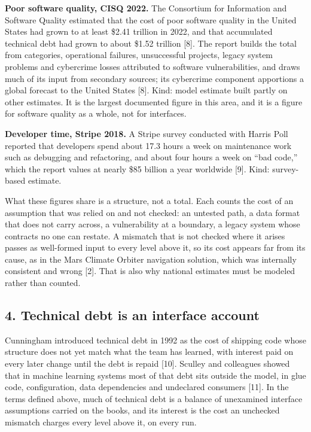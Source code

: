 \documentclass[
  10pt,
]{article}
\begin{document}
\textbf{Poor software quality, CISQ 2022.} The Consortium for
Information and Software Quality estimated that the cost of poor
software quality in the United States had grown to at least \$2.41
trillion in 2022, and that accumulated technical debt had grown to about
\$1.52 trillion {[}8{]}. The report builds the total from categories,
operational failures, unsuccessful projects, legacy system problems and
cybercrime losses attributed to software vulnerabilities, and draws much
of its input from secondary sources; its cybercrime component apportions
a global forecast to the United States {[}8{]}. Kind: model estimate
built partly on other estimates. It is the largest documented figure in
this area, and it is a figure for software quality as a whole, not for
interfaces.

\textbf{Developer time, Stripe 2018.} A Stripe survey conducted with
Harris Poll reported that developers spend about 17.3 hours a week on
maintenance work such as debugging and refactoring, and about four hours
a week on ``bad code,'' which the report values at nearly \$85 billion a
year worldwide {[}9{]}. Kind: survey-based estimate.

What these figures share is a structure, not a total. Each counts the
cost of an assumption that was relied on and not checked: an untested
path, a data format that does not carry across, a vulnerability at a
boundary, a legacy system whose contracts no one can restate. A mismatch
that is not checked where it arises passes as well-formed input to every
level above it, so its cost appears far from its cause, as in the Mars
Climate Orbiter navigation solution, which was internally consistent and
wrong {[}2{]}. That is also why national estimates must be modeled
rather than counted.

\subsection{4. Technical debt is an interface
account}\label{technical-debt-is-an-interface-account}

Cunningham introduced technical debt in 1992 as the cost of shipping
code whose structure does not yet match what the team has learned, with
interest paid on every later change until the debt is repaid {[}10{]}.
Sculley and colleagues showed that in machine learning systems most of
that debt sits outside the model, in glue code, configuration, data
dependencies and undeclared consumers {[}11{]}. In the terms defined
above, much of technical debt is a balance of unexamined interface
assumptions carried on the books, and its interest is the cost an
unchecked mismatch charges every level above it, on every run.
\end{document}
